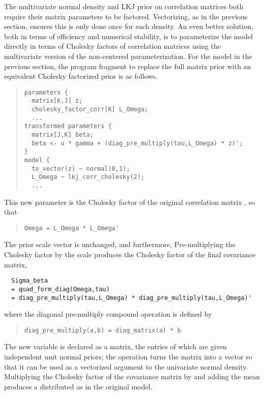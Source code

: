 The multivariate normal density and LKJ prior on correlation matrices
both require their matrix parameters to be factored.  Vectorizing, as
in the previous section, ensures this is only done once for each
density.  An even better solution, both in terms of efficiency and
numerical stability, is to parameterize the model directly in terms of
Cholesky factors of correlation matrices using the multivariate
version of the non-centered parameterization.  For the model in the
previous section, the program fragment to replace the full matrix
prior with an equivalent Cholesky factorized prior is as follows.
%
\begin{quote}
\begin{Verbatim}
parameters {
  matrix[K,J] z;
  cholesky_factor_corr[K] L_Omega;
  ...
transformed parameters {
  matrix[J,K] beta;
  beta <- u * gamma + (diag_pre_multiply(tau,L_Omega) * z)';
}
model {
  to_vector(z) ~ normal(0,1); 
  L_Omega ~ lkj_corr_cholesky(2);
  ...
\end{Verbatim}  
\end{quote}
%
This new parameter  is the Cholesky factor of
the original correlation matrix , so that 
%
\begin{quote}
\begin{Verbatim}
Omega = L_Omega * L_Omega'
\end{Verbatim}
\end{quote}
%
The prior scale vector  is unchanged, and furthermore,
Pre-multiplying the Cholesky factor by the scale produces the Cholesky
factor of the final covariance matrix,
%
\begin{Verbatim}
  Sigma_beta 
  = quad_form_diag(Omega,tau)
  = diag_pre_multiply(tau,L_Omega) * diag_pre_multiply(tau,L_Omega)'
\end{Verbatim}
%
where the diagonal pre-multiply compound operation is defined by 
%
\begin{quote}
\begin{Verbatim}
diag_pre_multiply(a,b) = diag_matrix(a) * b
\end{Verbatim}
\end{quote}
%
The new variable  is declared as a matrix, the entries of
which are given independent unit normal priors; the 
operation turns the matrix into a vector so that it can be used as a
vectorized argument to the univariate normal density.  Multiplying the
Cholesky factor of the covariance matrix by  and adding the
mean  produces a  distributed as in
the original model.

